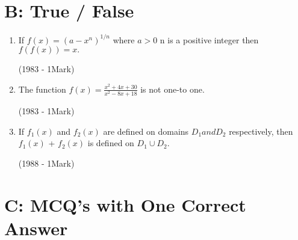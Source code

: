 \documentclass[journal,12pt,twocolumn]{IEEEtran}
\theoremstyle{remark}
\begin{document}
\section{B: True / False}




\begin{enumerate}

\item If $f(x)=(a-x^n)^{1/n}$ where $a>0$ n is a positive integer 
then $f(f(x))=x.$


 \hfill
{(1983 - 1Mark)}


 
\item The function $f(x)={\frac{x^2+4x+30}{x^2-8x+18}}$ is not one-to one.


\hfill
{(1983 - 1Mark)}




\item If $f{_1}(x)$
 and  $f{_2}(x)$ are  defined on domains $D{_1} and D{_2}$ respectively, then $f{_1}(x)$ + $f{_2}(x)$ is defined on $D{_1}\cup D{_2}$.


\hfill
{(1988 - 1Mark)}
\end{enumerate}




\section{C: MCQ's with One Correct Answer}



 
\end{document}
